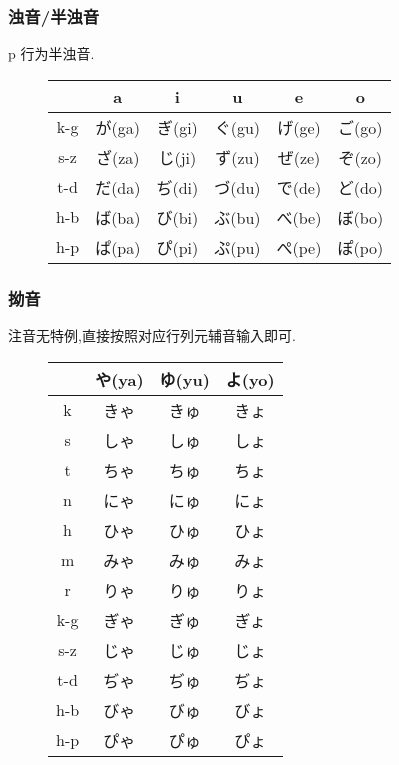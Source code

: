         \subsubsection{浊音/半浊音}
        p 行为半浊音.
        \begin{figure}[htbp]
            \centering
            \begin{tabular}{c||c|c|c|c|c}
                 & a & i & u & e & o\\\hline\hline
                k-g & が(ga) & ぎ(gi) & ぐ(gu) & げ(ge) & ご(go)\\\hline
                s-z & ざ(za) & じ(ji) & ず(zu) & ぜ(ze) & ぞ(zo)\\\hline
                t-d & だ(da) & ぢ(di) & づ(du) & で(de) & ど(do)\\\hline
                h-b & ば(ba) & び(bi) & ぶ(bu) & べ(be) & ぼ(bo)\\\hline
                h-p & ぱ(pa) & ぴ(pi) & ぷ(pu) & ぺ(pe) & ぽ(po)\\\hline
            \end{tabular}
        \end{figure}
        \subsubsection{拗音}
        注音无特例,直接按照对应行列元辅音输入即可.
        \begin{figure}[htbp]
            \centering
            \begin{tabular}{c||c|c|c}
                 & や(ya) & ゆ(yu) & よ(yo)\\\hline\hline
                 k & きゃ & きゅ & きょ\\\hline
                 s & しゃ & しゅ & しょ\\\hline
                 t & ちゃ & ちゅ & ちょ\\\hline
                 n & にゃ & にゅ & にょ\\\hline
                 h & ひゃ & ひゅ & ひょ\\\hline
                 m & みゃ & みゅ & みょ\\\hline
                 r & りゃ & りゅ & りょ\\\hline
                 k-g & ぎゃ & ぎゅ & ぎょ\\\hline
                 s-z & じゃ & じゅ & じょ\\\hline
                 t-d & ぢゃ & ぢゅ & ぢょ\\\hline
                 h-b & びゃ & びゅ & びょ\\\hline
                 h-p & ぴゃ & ぴゅ & ぴょ\\\hline
            \end{tabular}
        \end{figure}

